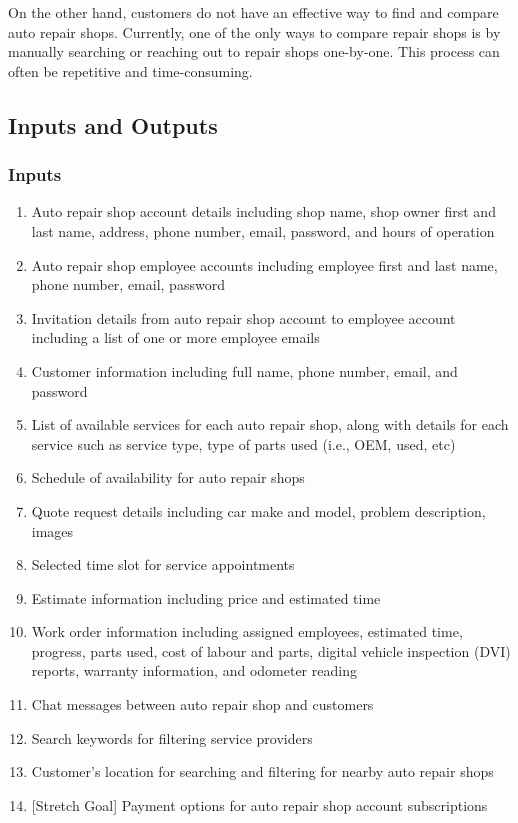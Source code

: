 \documentclass{article}
\begin{document}
On the other hand, customers do not have an effective way to find and compare auto repair shops.
Currently, one of the only ways to compare repair shops is by manually searching or reaching out to
repair shops one-by-one. This process can often be repetitive and time-consuming.

\subsection{Inputs and Outputs}
\subsubsection{Inputs}
\begin{enumerate}
	\item Auto repair shop account details including shop name, shop owner first and last name, address,
	      phone number, email, password, and hours of operation
	\item Auto repair shop employee accounts including employee first and last name, phone number, email,
	      password
	\item Invitation details from auto repair shop account to employee account including a list of one or
	      more employee emails
	\item Customer information including full name, phone number, email, and password
	\item List of available services for each auto repair shop, along with details for each service such as
	      service type, type of parts used {(i.e., OEM, used, etc)}
	\item Schedule of availability for auto repair shops
	\item Quote request details including car make and model, problem description, images
	\item Selected time slot for service appointments
	\item Estimate information including price and estimated time
	\item Work order information including assigned employees, estimated time, progress, parts used, cost of
	      labour and parts, digital vehicle inspection {(DVI)} reports, warranty information, and odometer
	      reading
	\item Chat messages between auto repair shop and customers
	\item Search keywords for filtering service providers
	\item Customer's location for searching and filtering for nearby auto repair shops
	\item {[Stretch Goal]} Payment options for auto repair shop account subscriptions
\end{enumerate}
\end{document}
